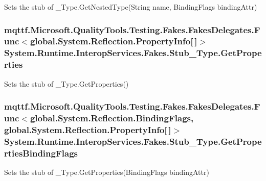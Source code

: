 Sets the stub of \-\_\-\-Type.\-Get\-Nested\-Type(\-String name, Binding\-Flags binding\-Attr)

\hypertarget{class_system_1_1_runtime_1_1_interop_services_1_1_fakes_1_1_stub___type_a0c9aa11fd15d1598c9f8b3cd98e7cc65}{
\subsubsection[{Get\-Properties}]{\setlength{\rightskip}{0pt plus 5cm}mqttf.\-Microsoft.\-Quality\-Tools.\-Testing.\-Fakes.\-Fakes\-Delegates.\-Func$<$global.\-System.\-Reflection.\-Property\-Info\mbox{[}$\,$\mbox{]}$>$ System.\-Runtime.\-Interop\-Services.\-Fakes.\-Stub\-\_\-\-Type.\-Get\-Properties}}\label{class_system_1_1_runtime_1_1_interop_services_1_1_fakes_1_1_stub___type_a0c9aa11fd15d1598c9f8b3cd98e7cc65}


Sets the stub of \-\_\-\-Type.\-Get\-Properties()

\hypertarget{class_system_1_1_runtime_1_1_interop_services_1_1_fakes_1_1_stub___type_a25001543236d72d9e33b39b2524c7727}{
\subsubsection[{Get\-Properties\-Binding\-Flags}]{\setlength{\rightskip}{0pt plus 5cm}mqttf.\-Microsoft.\-Quality\-Tools.\-Testing.\-Fakes.\-Fakes\-Delegates.\-Func$<$global.\-System.\-Reflection.\-Binding\-Flags, global.\-System.\-Reflection.\-Property\-Info\mbox{[}$\,$\mbox{]}$>$ System.\-Runtime.\-Interop\-Services.\-Fakes.\-Stub\-\_\-\-Type.\-Get\-Properties\-Binding\-Flags}}\label{class_system_1_1_runtime_1_1_interop_services_1_1_fakes_1_1_stub___type_a25001543236d72d9e33b39b2524c7727}


Sets the stub of \-\_\-\-Type.\-Get\-Properties(\-Binding\-Flags binding\-Attr)

